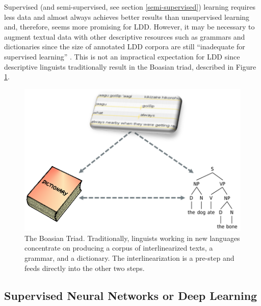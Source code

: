 \documentclass[12pt]{article}
\begin{document}
Supervised (and semi-supervised, see section \ref{semi-supervised}) learning requires less data and almost always achieves better results than unsupervised learning \cite{ruokolainen_supervised_2013} and, therefore, seems more promising for LDD. However, it may be necessary to augment textual data with other descriptive resources such as grammars and dictionaries since the size of annotated LDD corpora are still ``inadequate for supervised learning'' \cite[page 18]{duong_natural_2017}. This is not an impractical expectation for LDD since descriptive linguists traditionally result in the Boasian triad, described in Figure \ref{fig:Triad}.

\begin{figure}[ht]
\label{fig:Triad}
\begin{center}
\includegraphics[width=0.7\columnwidth]{Triad.PNG}
\caption{The Boasian Triad. Traditionally, linguists working in new languages concentrate on producing a corpus of interlinearized texts, a grammar, and a dictionary. The interlinearization is a pre-step and feeds directly into the other two steps.}
\end{center}
\end{figure}

\subsection{Supervised Neural Networks or Deep Learning}
\end{document}
